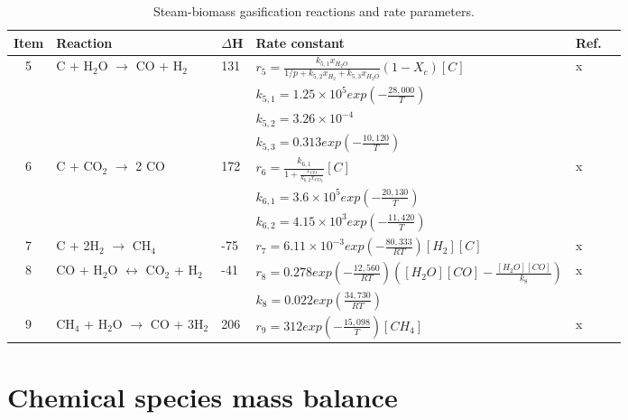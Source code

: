 \documentclass[12pt,titlepage]{article}
\begin{document}
\begin{table}[ht]
    \caption{Steam-biomass gasification reactions and rate parameters.}
    \label{tab:gasification}
    \begin{adjustwidth}{-0.5in}{-0.5in}
    \centering
    \small
    \begin{tabular}{clllll}
        \toprule
        Item & Reaction & $\Delta$H & Rate constant & Ref. \\
        \midrule
        5 & C + H$_2$O $\rightarrow$ CO + H$_2$ & 131 & $\displaystyle r_5 = \frac{k_{5,1} x_{H_2O}}{1/p + k_{5,2} x_{H_2} + k_{5,3} x_{H_2O}} (1 - X_c) [C]$ & x \\[1.5em]
          & & & $\displaystyle k_{5,1} = 1.25 \times 10^5 exp\left( -\frac{28,000}{T} \right)$ & \\[1em]
          & & & $\displaystyle k_{5,2} = 3.26 \times 10^{-4}$ & \\[1em]
          & & & $\displaystyle k_{5,3} = 0.313 exp \left( -\frac{10,120}{T} \right)$ & \\[1em]
        6 & C + CO$_2$ $\rightarrow$ 2 CO & 172 & $\displaystyle r_6 = \frac{k_{6,1}}{1 + \frac{x_{CO}}{k_{6,2} x_{CO_2}}} [C]$ & x \\[1.5em]
          & & & $\displaystyle k_{6,1} = 3.6 \times 10^5 exp \left( -\frac{20,130}{T} \right)$ & \\[1em]
          & & & $\displaystyle k_{6,2} = 4.15 \times 10^3 exp \left( -\frac{11,420}{T} \right)$ & \\[1em]
        7 & C + 2H$_2$ $\rightarrow$ CH$_4$ & -75 & $\displaystyle r_7 = 6.11 \times 10^{-3} exp \left( -\frac{80,333}{R T} \right) [H_2][C]$ & x \\[1.5em]
        8 & CO + H$_2$O $\leftrightarrow$ CO$_2$ + H$_2$ & -41 & $\displaystyle r_8 = 0.278 exp \left(-\frac{12,560}{R T} \right) \left([H_2O][CO] - \frac{[H_2O][CO]}{k_8} \right)$ & x \\[1em]
          & & & $\displaystyle k_8 = 0.022 exp \left( \frac{34,730}{R T} \right)$ & \\[1em]
        9 & CH$_4$ + H$_2$O $\rightarrow$ CO + 3H$_2$ & 206 & $\displaystyle r_9 = 312 exp \left( -\frac{15,098}{T} \right) [CH_4]$ & x \\[1.5em]
        \bottomrule
    \end{tabular}
    \end{adjustwidth}
\end{table}

\section{Chemical species mass balance}
\end{document}
